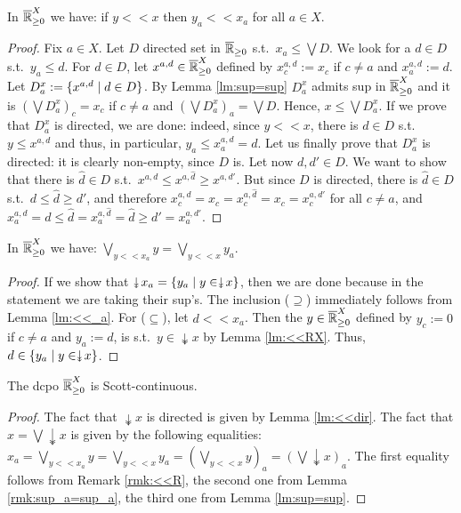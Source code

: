 \begin{lemma}\label{lm:<<_a}
 In $\overline{\mathbb{R}}_{\geq 0}^X$ we have:
 if $y<<x$ then $y_a<< x_a$ for all $a\in X$.
\end{lemma}
\begin{proof}
 Fix $a\in X$.
 Let $D$ directed set in $\overline{\mathbb{R}}_{\geq 0}$ s.t.\ $x_a\leq\bigvee D$.
 We look for a $d\in D$ s.t.\ $y_a\leq d$.
 For $d\in D$, let $x^{a,d}\in\overline{\mathbb{R}}_{\geq 0}^X$ defined by $x^{a,d}_c:=x_c$ if $c\neq a$ and $x^{a,d}_a:=d$.
 Let $D^x_a:=\{x^{a,d}\mid d\in D\}$.
 By Lemma \ref{lm:sup=sup} $D^x_a$ admits sup in $\overline{\mathbb{R}}_{\geq 0}^X$ and it is $(\bigvee D^x_a)_c=x_c$ if $c\neq a$ and $(\bigvee D^x_a)_a=\bigvee D$.
 Hence, $x\leq \bigvee D^x_a$.
 If we prove that $D^x_a$ is directed, we are done: indeed, since $y<<x$, there is $d\in D$ s.t.\ $y\leq x^{a,d}$ and thus, in particular, $y_a\leq x^{a,d}_a=d$.
 Let us finally prove that $D^x_a$ is directed: it is clearly non-empty, since $D$ is.
 Let now $d,d'\in D$.
 We want to show that there is $\hat d\in D$ s.t.\ $x^{a,d}\leq x^{a,\hat d}\geq x^{a,d'}$.
 But since $D$ is directed, there is $\hat d\in D$ s.t.\ $d\leq \hat d\geq d'$, and therefore $x^{a,d}_c=x_c= x^{a,\hat d}_c =x_c=x^{a,d'}_c$ for all $c\neq a$, and $x^{a,d}_a=d\leq \hat d=x^{a,\hat d}_a=\hat d \geq d'=x^{a,d'}_a$.
\end{proof}

\begin{lemma}\label{rmk:sup_a=sup_a}
In $\overline{\mathbb{R}}_{\geq 0}^X$ we have:
$\bigvee\limits_{y<<x_a} y = \bigvee\limits_{y<<x} y_a$.
\end{lemma}
\begin{proof}
 If we show that $\twoheaddownarrow x_a = \set{y_a\mid y\in\twoheaddownarrow x}$, then we are done because in the statement we are taking their sup's.
 The inclusion ($\supseteq$) immediately follows from Lemma \ref{lm:<<_a}. For ($\subseteq$), let $d<< x_a$.
 Then the $y\in \overline{\mathbb{R}}_{\geq 0}^X$ defined by $y_c:=0$ if $c\neq a$ and $y_a:=d$, is s.t.\ $y\in\twoheaddownarrow x$ by Lemma \ref{lm:<<RX}.
 Thus, $d\in \set{y_a\mid y\in\twoheaddownarrow x}$.
\end{proof}


\begin{corollary}
 The dcpo $\overline{\mathbb{R}}_{\geq 0}^X$ is Scott-continuous.
\end{corollary}
\begin{proof}
 The fact that $\twoheaddownarrow x$ is directed is given by Lemma \ref{lm:<<dir}. The fact that $x=\bigvee \twoheaddownarrow x$ is given by the following equalities:
 $x_a=\bigvee\limits_{y<<x_a} y = \bigvee\limits_{y<<x} y_a = \left(\bigvee\limits_{y<<x} y\right)_a=\left(\bigvee \twoheaddownarrow x\right)_a$.
 The first equality follows from Remark \ref{rmk:<<R}, the second one from Lemma \ref{rmk:sup_a=sup_a}, the third one from Lemma \ref{lm:sup=sup}.
\end{proof}

